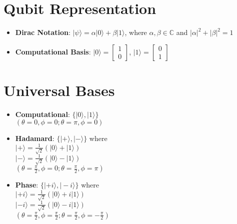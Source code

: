\begin{multicols}{3}

    \section*{Qubit Representation}
    \begin{itemize}[leftmargin=*,nosep,topsep=0pt]
      \item \textbf{Dirac Notation}: $|\psi\rangle = \alpha|0\rangle + \beta|1\rangle$, where $\alpha,\beta \in \mathbb{C}$ and $|\alpha|^2 + |\beta|^2 = 1$
      \item \textbf{Computational Basis}: $|0\rangle = \begin{bmatrix} 1 \\ 0 \end{bmatrix}$, $|1\rangle = \begin{bmatrix} 0 \\ 1 \end{bmatrix}$
    \end{itemize}

    \section*{Universal Bases}
    \begin{itemize}[leftmargin=*,nosep,topsep=0pt]
      \item \textbf{Computational}: $\{|0\rangle, |1\rangle\}$ \\
        $(\theta=0, \phi=0; \theta=\pi, \phi=0)$
      \item \textbf{Hadamard}: $\{|+\rangle, |-\rangle\}$ where \\
        $|+\rangle = \frac{1}{\sqrt{2}}(|0\rangle + |1\rangle)$ \\
        $|-\rangle = \frac{1}{\sqrt{2}}(|0\rangle - |1\rangle)$ \\
        $(\theta=\frac{\pi}{2}, \phi=0; \theta=\frac{\pi}{2}, \phi=\pi)$
      \item \textbf{Phase}: $\{|+i\rangle, |-i\rangle\}$ where \\
        $|+i\rangle = \frac{1}{\sqrt{2}}(|0\rangle + i|1\rangle)$ \\
        $|-i\rangle = \frac{1}{\sqrt{2}}(|0\rangle - i|1\rangle)$ \\
        $(\theta=\frac{\pi}{2}, \phi=\frac{\pi}{2}; \theta=\frac{\pi}{2}, \phi=-\frac{\pi}{2})$
    \end{itemize}


\end{multicols}
